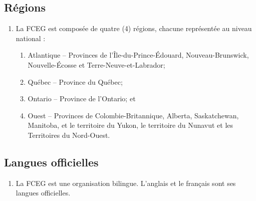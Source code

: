 \subsection{Régions}
\label{dispositions-regions}

\begin{enumerate}
 \item La FCEG est composée de quatre (4) régions, chacune représentée au niveau national :
  \begin{enumerate}
   \item Atlantique – Provinces de l’Île-du-Prince-Édouard, Nouveau-Brunswick, Nouvelle-Écosse et Terre-Neuve-et-Labrador;
   \item Québec – Province du Québec;
   \item Ontario – Province de l’Ontario; et
   \item Ouest – Provinces de Colombie-Britannique, Alberta, Saskatchewan, Manitoba, et le territoire du Yukon, le territoire du Nunavut et les Territoires du Nord-Ouest.
  \end{enumerate}
\end{enumerate}

\subsection{Langues officielles}
\label{dispositions-langues-officielles}

\begin{enumerate}
 \item La FCEG est une organisation bilingue. L'anglais et le français sont ses langues officielles.
\end{enumerate}
